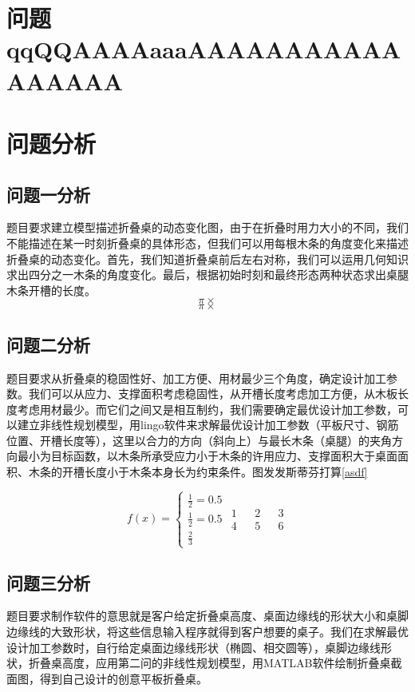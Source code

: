 \documentclass[bwprint]{gmcmthesis}
\begin{document}
\section{问题qqQQAAAAaaaAAAAAAAAAAAAAAAAA}
\section{问题分析}

\subsection{问题一分析}
题目要求建立模型描述折叠桌的动态变化图，由于在折叠时用力大小的不同，我们不能描述在某一时刻折叠桌的具体形态，但我们可以用每根木条的角度变化来描述折叠桌的动态变化。首先，我们知道折叠桌前后左右对称，我们可以运用几何知识求出四分之一木条的角度变化。最后，根据初始时刻和最终形态两种状态求出桌腿木条开槽的长度。
$$\pi\times$$
\begin{equation}
\pi\times
\end{equation}


\subsection{问题二分析}
题目要求从折叠桌的稳固性好、加工方便、用材最少三个角度，确定设计加工参数。我们可以从应力、支撑面积考虑稳固性，从开槽长度考虑加工方便，从木板长度考虑用材最少。而它们之间又是相互制约，我们需要确定最优设计加工参数，可以建立非线性规划模型，用lingo软件来求解最优设计加工参数（平板尺寸、钢筋位置、开槽长度等），这里以合力的方向（斜向上）与最长木条（桌腿）的夹角方向最小为目标函数，以木条所承受应力小于木条的许用应力、支撑面积大于桌面面积、木条的开槽长度小于木条本身长为约束条件。图发发斯蒂芬打算\ref{asdf}

\begin{equation}
    f(x) = \begin{cases}
        \frac{1}{2} = 0.5 \\
        \frac{1}{2} = 0.5 \\
        \frac{2}{3}
    \end{cases}\label{asdf}
    \begin{matrix}
        1 && 2 && 3 \\
        4 && 5 && 6
    \end{matrix}
\end{equation}

\subsection{问题三分析}
题目要求制作软件的意思就是客户给定折叠桌高度、桌面边缘线的形状大小和桌脚边缘线的大致形状，将这些信息输入程序就得到客户想要的桌子。我们在求解最优设计加工参数时，自行给定桌面边缘线形状（椭圆、相交圆等），桌脚边缘线形状，折叠桌高度，应用第二问的非线性规划模型，用MATLAB软件绘制折叠桌截面图，得到自己设计的创意平板折叠桌。
\end{document}
